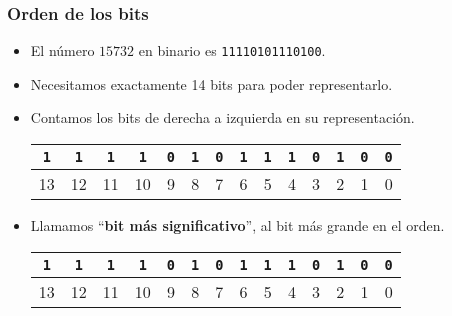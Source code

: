 \documentclass[aspectratio=169]{beamer}
\begin{document}
\begin{frame}[fragile,t]
    \frametitle{Orden de los bits}
    \begin{itemize}
    \setlength\itemsep{13px}
     \item El número $15732$ en binario es \texttt{11110101110100}.
     \item Necesitamos exactamente 14 bits para poder representarlo.
     \item Contamos los bits de derecha a izquierda en su representación.
     \begin{tabular}{cccccccccccccc}
     \texttt{1} & \texttt{1} & \texttt{1} & \texttt{1} & \texttt{0} & \texttt{1} & \texttt{0} & \texttt{1} & \texttt{1} & \texttt{1} & \texttt{0} & \texttt{1} & \texttt{0} & \texttt{0} \\
     \hline
     \textcolor{verdeuca}{\scriptsize 13} & \textcolor{verdeuca}{\scriptsize 12} & \textcolor{verdeuca}{\scriptsize 11} & \textcolor{verdeuca}{\scriptsize 10} & \textcolor{verdeuca}{\scriptsize 9} & \textcolor{verdeuca}{\scriptsize 8} & \textcolor{verdeuca}{\scriptsize 7} & \textcolor{verdeuca}{\scriptsize 6} & \textcolor{verdeuca}{\scriptsize 5} & \textcolor{verdeuca}{\scriptsize 4} & \textcolor{verdeuca}{\scriptsize 3} & \textcolor{verdeuca}{\scriptsize 2} & \textcolor{verdeuca}{\scriptsize 1} & \textcolor{verdeuca}{\scriptsize 0} \\
     \end{tabular}
     \item Llamamos ``\textbf{bit más significativo}'', al bit más grande en el orden. %
     \begin{tabular}{cccccccccccccc}
     \textcolor{naranjauca}{\texttt{1}} & \textcolor{Gris}{\texttt{1}} & \textcolor{Gris}{\texttt{1}} & \textcolor{Gris}{\texttt{1}} & \textcolor{Gris}{\texttt{0}} & \textcolor{Gris}{\texttt{1}} & \textcolor{Gris}{\texttt{0}} & \textcolor{Gris}{\texttt{1}} & \textcolor{Gris}{\texttt{1}} & \textcolor{Gris}{\texttt{1}} & \textcolor{Gris}{\texttt{0}} & \textcolor{Gris}{\texttt{1}} & \textcolor{Gris}{\texttt{0}} & \textcolor{Gris}{\texttt{0}} \\
     \hline
     \textcolor{naranjauca}{\normalsize 13} & {\scriptsize 12} & {\scriptsize 11} & {\scriptsize 10} & {\scriptsize 9} & {\scriptsize 8} & {\scriptsize 7} & {\scriptsize 6} & {\scriptsize 5} & {\scriptsize 4} & {\scriptsize 3} & {\scriptsize 2} & {\scriptsize 1} & {\scriptsize 0} \\
     \end{tabular}

\end{itemize}
\end{frame}
\end{document}
